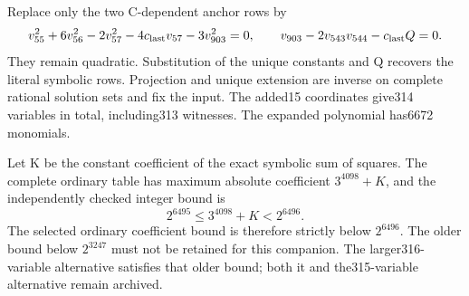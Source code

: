 Replace only the two C-dependent anchor rows by
\[
 v_{55}^2+6v_{56}^2-2v_{57}^2-4c_{\rm last}v_{57}
       -3v_{903}^2=0,
\qquad
 v_{903}-2v_{543}v_{544}-c_{\rm last}Q=0.
\]
They remain quadratic. Substitution of the unique constants and Q
recovers the literal symbolic rows. Projection and unique extension
are inverse on complete rational solution sets and fix the input.
The added15 coordinates give314 variables in total, including313
witnesses. The expanded polynomial has6672 monomials.

Let K be the constant coefficient of the exact symbolic sum of
squares. The complete ordinary table has maximum absolute coefficient
$3^{4098}+K$, and the independently checked integer bound is
\[
 2^{6495}\le 3^{4098}+K<2^{6496}.
\]
The selected ordinary coefficient bound is therefore strictly below
$2^{6496}$. The older bound below $2^{3247}$ must not be retained for
this companion. The larger316-variable alternative satisfies that
older bound; both it and the315-variable alternative remain archived.
